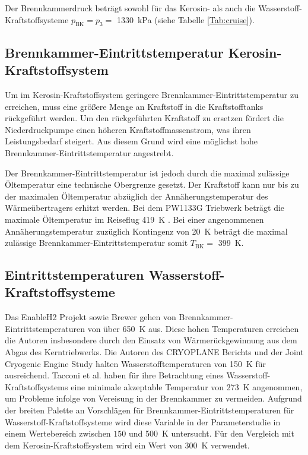 Der Brennkammerdruck beträgt sowohl für das Kerosin- als auch die Wasserstoff-Kraftstoffsysteme $p_\mathrm{BK}=p_3=$ \SI{1330}{\kilo\Pa} (siehe Tabelle \ref{Tab:cruise}).

\subsection{Brennkammer-Eintrittstemperatur Kerosin-Kraftstoffsystem}

Um im Kerosin-Kraftstoffsystem geringere Brennkammer-Eintrittstemperatur zu erreichen, muss eine größere Menge an Kraftstoff in die Kraftstofftanks rückgeführt werden. Um den rückgeführten Kraftstoff zu ersetzen fördert die Niederdruckpumpe einen höheren Kraftstoffmassenstrom, was ihren Leistungsbedarf steigert. Aus diesem Grund wird eine möglichst hohe Brennkammer-Eintrittstemperatur angestrebt. 

Der Brennkammer-Eintrittstemperatur ist jedoch durch die maximal zulässige Öltemperatur eine technische Obergrenze gesetzt. Der Kraftstoff kann nur bis zu der maximalen Öltemperatur abzüglich der Annäherungstemperatur des Wärmeübertragers erhitzt werden. Bei dem PW1133G Triebwerk beträgt die maximale Öltemperatur im Reiseflug \SI{419}{\K} \cite{EASA.2018}. Bei einer angenommenen Annäherungstemperatur zuzüglich Kontingenz von \SI{20}{\K} beträgt die maximal zulässige Brennkammer-Eintrittstemperatur somit $T_\mathrm{BK}=$ \SI{399}{\K}.

\subsection{Eintrittstemperaturen Wasserstoff-Kraftstoffsysteme}

Das EnableH2 Projekt \cite{Patrao.2023} sowie Brewer \cite{Brewer.1991} gehen von Brennkammer-Eintrittstemperaturen von über \SI{650}{\K} aus. Diese hohen Temperaturen erreichen die Autoren insbesondere durch den Einsatz von Wärmerückgewinnung aus dem Abgas des Kerntriebwerks. Die Autoren des CRYOPLANE Berichts \cite{Scholz.2003} und der Joint Cryogenic Engine Study \cite{SIMON.1994} halten Wasserstofftemperaturen von \SI{150}{\K} für ausreichend. Tacconi et al. \cite{Tacconi.2023} haben für ihre Betrachtung eines Wasserstoff-Kraftstoffsystems eine minimale akzeptable Temperatur von \SI{273}{\K} angenommen, um Probleme infolge von Vereisung in der Brennkammer zu vermeiden. Aufgrund der breiten Palette an Vorschlägen für Brennkammer-Eintrittstemperaturen für Wasserstoff-Kraftstoffsysteme wird diese Variable in der Parameterstudie in einem Wertebereich zwischen $150$ und \SI{500}{\K} untersucht. Für den Vergleich mit dem Kerosin-Kraftstoffsystem wird ein Wert von \SI{300}{\K} verwendet.

